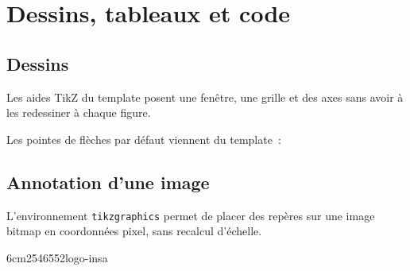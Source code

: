 
\chapter{Dessins, tableaux et code}%
\label{chap:graphics}
\minitoc%

\section{Dessins}%
\label{sec:tikz}

Les aides TikZ du template posent une fenêtre, une grille et des axes sans
avoir à les redessiner à chaque figure.

\begin{center}
\end{center}

Les pointes de flèches par défaut viennent du template~:
\begin{center}
\end{center}

\section{Annotation d'une image}%
\label{sec:tikzgraphics}

L'environnement \texttt{tikzgraphics} permet de placer des repères sur une
image bitmap en coordonnées pixel, sans recalcul d'échelle.

\begin{center}
\begin{tikzgraphics}{6cm}{2546}{552}{logo-insa}
\end{tikzgraphics}
\end{center}

